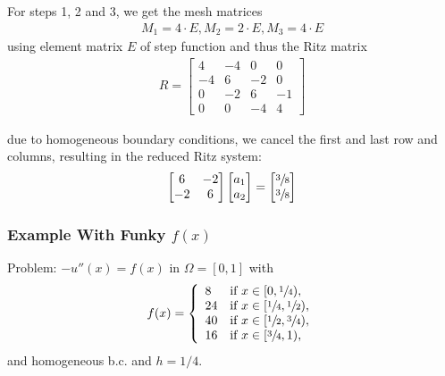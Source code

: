 For steps 1, 2 and 3, we get the mesh matrices
\begin{align*}
    M_1 = 4\cdot E, M_2=2\cdot E, M_3 = 4\cdot E
\end{align*}
using element matrix $E$ of step function and thus the Ritz matrix
\begin{align*}
    R=\begin{bmatrix}
        4 & -4 & 0 & 0 \\
        -4 & 6 & -2 & 0 \\
        0 & -2 & 6 & -1 \\
        0 & 0 & -4 & 4
    \end{bmatrix}
\end{align*}

due to homogeneous boundary conditions, we cancel the first and last row and columns, resulting in the reduced Ritz system:
\begin{align*}
    \begin{bmatrix}
        6 & -2 \\
        -2 & 6
    \end{bmatrix}
    \begin{bmatrix}
        a_1 \\ a_2
    \end{bmatrix}
    =
    \begin{bmatrix}
        \sfrac{3}{8} \\ \sfrac{3}{8}
    \end{bmatrix}
\end{align*}

\subsubsection{Example With Funky $f(x)$}

Problem: $-u''(x) = f(x)$ in $\Omega = [0,1]$ with
\begin{align*}
    f(x) = \left\{
    \begin{array}{ll}
        8 & \text{if } x\in [0,\sfrac{1}{4}), \\
        24 & \text{if } x\in [\sfrac{1}{4},\sfrac{1}{2}), \\
        40 & \text{if } x\in [\sfrac{1}{2},\sfrac{3}{4}), \\
        16 & \text{if } x\in [\sfrac{3}{4},1),
    \end{array}
    \right.
\end{align*}
and homogeneous b.c. and $h = 1/4$.


